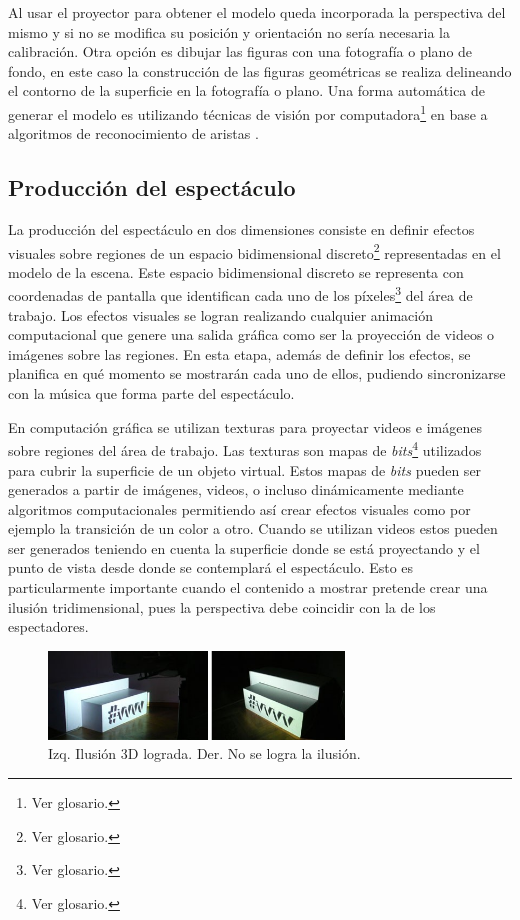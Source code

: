 \begin{itemize}
Al usar el proyector para obtener el modelo queda incorporada la perspectiva del mismo y si no se modifica su posición y orientación no sería necesaria la calibración.
Otra opción es dibujar las figuras con una fotografía o plano de fondo, en este caso la construcción de las figuras geométricas se realiza delineando el contorno de la superficie en la fotografía o plano.
Una forma automática de generar el modelo es utilizando técnicas de visión por computadora\footnote{Ver glosario.} en base a algoritmos de reconocimiento de aristas \cite{ArticuloAutom2dmodel}.
\end{itemize}

\subsection{Producción del espectáculo}
La producción del espectáculo en dos dimensiones consiste en definir efectos visuales sobre regiones de un espacio bidimensional discreto\footnote{Ver glosario.} representadas en el modelo de la escena. Este espacio bidimensional discreto se representa con coordenadas de pantalla que identifican cada uno de los píxeles\footnote{Ver glosario.} del área de trabajo. Los efectos visuales se logran realizando cualquier animación computacional que genere una salida gráfica como ser la proyección de videos o imágenes sobre las regiones.
En esta etapa, además de definir los efectos, se planifica en qué momento se mostrarán cada uno de ellos, pudiendo sincronizarse con la música que forma parte del espectáculo.

En computación gráfica se utilizan texturas para proyectar videos e imágenes sobre regiones del área de trabajo. Las texturas son mapas de \emph{bits}\footnote{Ver glosario.} utilizados para cubrir la superficie de un objeto virtual. Estos mapas de \emph{bits} pueden ser generados a partir de imágenes, videos, o incluso dinámicamente mediante algoritmos computacionales permitiendo así crear efectos visuales como por ejemplo la transición de un color a otro.
Cuando se utilizan videos estos pueden ser generados teniendo en cuenta la superficie donde se está proyectando y el punto de vista desde donde se contemplará el espectáculo. Esto es particularmente importante cuando el contenido a mostrar pretende crear una ilusión tridimensional, pues la perspectiva debe coincidir con la de los espectadores.
\begin{figure}[H]
  \centering
    \includegraphics[width=0.7\textwidth]{./Cap2_videomapping/3dillusion}
  \caption{Izq. Ilusión 3D lograda. Der. No se logra la ilusión.}
  \label{fig:3dillusion}
\end{figure}

